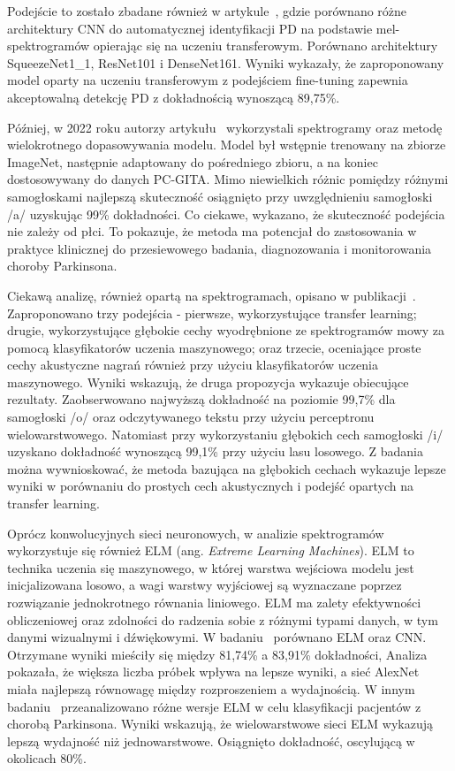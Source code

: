 Podejście to zostało zbadane również w artykule~\cite{KARAMAN2021115013}, gdzie  porównano różne architektury CNN do automatycznej identyfikacji PD na podstawie mel-spektrogramów opierając się na uczeniu transferowym.
Porównano architektury SqueezeNet1\_1, ResNet101 i DenseNet161.
Wyniki wykazały, że zaproponowany model oparty na uczeniu transferowym z podejściem fine-tuning zapewnia akceptowalną detekcję PD z dokładnością wynoszącą 89,75\%.


Później, w 2022 roku autorzy artykułu~\cite{HIRES2022105021} wykorzystali spektrogramy oraz metodę wielokrotnego dopasowywania modelu.
Model był wstępnie trenowany na zbiorze ImageNet, następnie adaptowany do pośredniego zbioru, a na koniec dostosowywany do danych PC-GITA.
Mimo niewielkich różnic pomiędzy różnymi samogłoskami najlepszą skuteczność osiągnięto przy uwzględnieniu samogłoski /a/ uzyskując 99\% dokładności.
Co ciekawe, wykazano, że skuteczność podejścia nie zależy od płci.
To pokazuje, że metoda ma potencjał do zastosowania w praktyce klinicznej do przesiewowego badania, diagnozowania i monitorowania choroby Parkinsona.

Ciekawą analizę, również opartą na spektrogramach, opisano w publikacji~\cite{8999815}.
Zaproponowano trzy podejścia - pierwsze, wykorzystujące transfer learning; drugie, wykorzystujące głębokie cechy wyodrębnione ze
spektrogramów mowy za pomocą klasyfikatorów uczenia maszynowego; oraz trzecie, oceniające
proste cechy akustyczne nagrań również przy użyciu klasyfikatorów uczenia maszynowego.
Wyniki wskazują, że druga propozycja wykazuje obiecujące rezultaty.
Zaobserwowano najwyższą dokładność na poziomie 99,7\% dla samogłoski /o/ oraz odczytywanego tekstu przy użyciu perceptronu wielowarstwowego.
Natomiast przy wykorzystaniu głębokich cech samogłoski /i/ uzyskano dokładność wynoszącą 99,1\% przy użyciu lasu losowego.
Z badania można wywnioskować, że metoda bazująca na głębokich cechach wykazuje lepsze wyniki w porównaniu do prostych cech akustycznych i
podejść opartych na transfer learning.

Oprócz konwolucyjnych sieci neuronowych, w analizie spektrogramów wykorzystuje się również ELM (ang. \emph{Extreme Learning Machines}).
ELM to technika uczenia się maszynowego, w której warstwa wejściowa modelu jest inicjalizowana losowo, a wagi warstwy wyjściowej są wyznaczane
poprzez rozwiązanie jednokrotnego równania liniowego.
ELM ma zalety efektywności obliczeniowej oraz zdolności do radzenia sobie z różnymi typami danych,
w tym danymi wizualnymi i dźwiękowymi.
W badaniu~\cite{GUATELLI2023106700} porównano ELM oraz CNN\@.
Otrzymane wyniki mieściły się między 81,74\% a 83,91\% dokładności,
Analiza pokazała, że większa liczba próbek wpływa na lepsze wyniki, a sieć AlexNet miała najlepszą równowagę między rozproszeniem a wydajnością.
W innym badaniu~\cite{Gelvez-Almeida_2022} przeanalizowano różne wersje ELM w celu klasyfikacji pacjentów z chorobą Parkinsona.
Wyniki wskazują, że wielowarstwowe sieci ELM wykazują lepszą wydajność niż jednowarstwowe.
Osiągnięto dokładność, oscylującą w okolicach 80\%.

